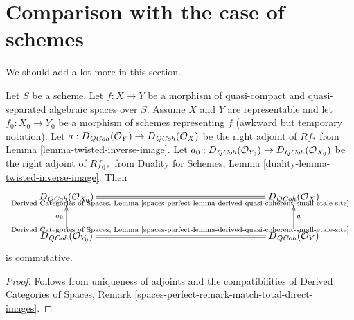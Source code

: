 \section{Comparison with the case of schemes}
\label{section-comparison}

\noindent
We should add a lot more in this section.

\begin{lemma}
\label{lemma-compare}
Let $S$ be a scheme. Let $f : X \to Y$ be a morphism of
quasi-compact and quasi-separated algebraic spaces over $S$.
Assume $X$ and $Y$ are representable and let $f_0 : X_0 \to Y_0$ be a
morphism of schemes representing $f$ (awkward but temporary notation).
Let $a : D_{\mathit{QCoh}}(\mathcal{O}_Y) \to D_{\mathit{QCoh}}(\mathcal{O}_X)$
be the right adjoint of $Rf_*$ from Lemma \ref{lemma-twisted-inverse-image}.
Let $a_0 : D_{\mathit{QCoh}}(\mathcal{O}_{Y_0}) \to D_{\mathit{QCoh}}(\mathcal{O}_{X_0})$
be the right adjoint of $Rf_{0*}$ from
Duality for Schemes, Lemma \ref{duality-lemma-twisted-inverse-image}.
Then 
$$
\xymatrix{
D_\QCoh(\mathcal{O}_{X_0})
\ar@{=}[rrrrrr]_{\text{Derived Categories of Spaces, Lemma
\ref{spaces-perfect-lemma-derived-quasi-coherent-small-etale-site}}}
& & & & & &
D_\QCoh(\mathcal{O}_X) \\
D_\QCoh(\mathcal{O}_{Y_0}) \ar[u]^{a_0}
\ar@{=}[rrrrrr]^{\text{Derived Categories of Spaces, Lemma
\ref{spaces-perfect-lemma-derived-quasi-coherent-small-etale-site}}}
& & & & & &
D_\QCoh(\mathcal{O}_Y) \ar[u]_a
}
$$
is commutative.
\end{lemma}

\begin{proof}
Follows from uniqueness of adjoints and the compatibilities of
Derived Categories of Spaces, Remark
\ref{spaces-perfect-remark-match-total-direct-images}.
\end{proof}















